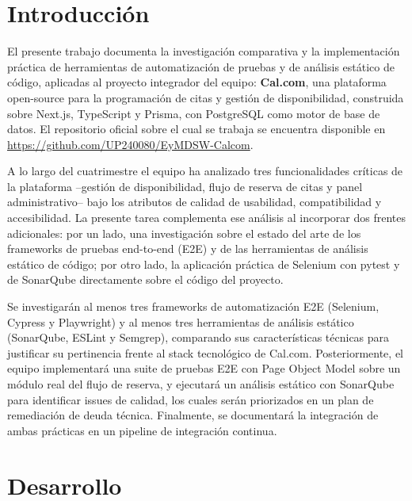 \documentclass[12pt,a4paper]{article}
\begin{document}

\section{Introducción}

El presente trabajo documenta la investigación comparativa y la
implementación práctica de herramientas de automatización de pruebas
y de análisis estático de código, aplicadas al proyecto integrador
del equipo: \textbf{Cal.com}, una plataforma open-source para la
programación de citas y gestión de disponibilidad, construida sobre
Next.js, TypeScript y Prisma, con PostgreSQL como motor de base de
datos. El repositorio oficial sobre el cual se trabaja se encuentra
disponible en \url{https://github.com/UP240080/EyMDSW-Calcom}.

A lo largo del cuatrimestre el equipo ha analizado tres
funcionalidades críticas de la plataforma --gestión de
disponibilidad, flujo de reserva de citas y panel administrativo--
bajo los atributos de calidad de usabilidad, compatibilidad y
accesibilidad. La presente tarea complementa ese análisis al
incorporar dos frentes adicionales: por un lado, una investigación
sobre el estado del arte de los frameworks de pruebas end-to-end
(E2E) y de las herramientas de análisis estático de código; por otro
lado, la aplicación práctica de Selenium con pytest y de SonarQube
directamente sobre el código del proyecto.

Se investigarán al menos tres frameworks de automatización E2E
(Selenium, Cypress y Playwright) y al menos tres herramientas de
análisis estático (SonarQube, ESLint y Semgrep), comparando sus
características técnicas para justificar su pertinencia frente al
stack tecnológico de Cal.com. Posteriormente, el equipo implementará
una suite de pruebas E2E con Page Object Model sobre un módulo real
del flujo de reserva, y ejecutará un análisis estático con
SonarQube para identificar issues de calidad, los cuales serán
priorizados en un plan de remediación de deuda técnica. Finalmente,
se documentará la integración de ambas prácticas en un pipeline de
integración continua.
\clearpage



\section{Desarrollo}
\end{document}
